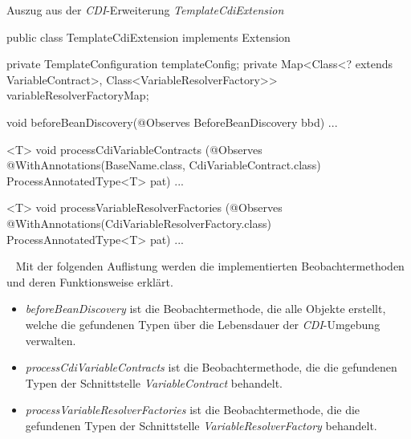 \begin{program}
\caption{Auszug aus der \emph{CDI}-Erweiterung \emph{TemplateCdiExtension}}
\label{prog:templateCdiExtension}
\begin{JavaCode}
public class TemplateCdiExtension implements Extension {

    private TemplateConfiguration templateConfig;
    private Map<Class<? extends VariableContract>, 
                Class<VariableResolverFactory>>  
                      variableResolverFactoryMap;

    void beforeBeanDiscovery(@Observes BeforeBeanDiscovery bbd) { ... }

    <T> void processCdiVariableContracts
             (@Observes @WithAnnotations({BaseName.class, 
                                          CdiVariableContract.class}) 
             ProcessAnnotatedType<T> pat) { ... }

    <T> void processVariableResolverFactories
        (@Observes @WithAnnotations(CdiVariableResolverFactory.class) 
         ProcessAnnotatedType<T> pat) { ... }
}
\end{JavaCode}
\end{program}
\ \newline
Mit der folgenden Auflistung werden die implementierten Beobachtermethoden und deren Funktionsweise erklärt.
\begin{itemize}
	\item\emph{beforeBeanDiscovery} 
	\newline
	ist die Beobachtermethode, die alle Objekte erstellt, welche die gefundenen Typen über die Lebensdauer der \emph{CDI}-Umgebung verwalten.
	\item\emph{processCdiVariableContracts} 
	\newline
	ist die Beobachtermethode, die die gefundenen Typen der Schnittstelle \emph{VariableContract} behandelt.
	\item\emph{processVariableResolverFactories} 
	\newline
	ist die Beobachtermethode, die die gefundenen Typen der Schnittstelle \emph{VariableResolverFactory} behandelt.
\end{itemize}

